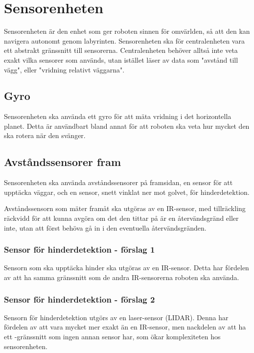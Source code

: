 \documentclass[a4paper,titlepage,12pt]{article}
\begin{document}
	\section{Sensorenheten}
    
    Sensorenheten är den enhet som ger roboten sinnen för omvärlden, så att den
    kan navigera autonomt genom labyrinten. Sensorenheten ska för
    centralenheten vara ett abstrakt gränssnitt till sensorerna. Centralenheten
    behöver alltså inte veta exakt vilka sensorer som används, utan istället
    läser av data som "avstånd till vägg", eller "vridning relativt väggarna".

    \subsection{Gyro}
    
    Sensorenheten ska använda ett gyro för att mäta vridning i det horizontella
    planet. Detta är användbart bland annat för att roboten ska veta hur mycket
    den ska rotera när den svänger.
    
    \subsection{Avståndssensorer fram}
    
    Sensorenheten ska använda avståndssensorer på framsidan, en sensor för att
    upptäcka väggar, och en sensor, snett vinklat ner mot golvet, för hinderdetektion. 

    Avståndssensorn som mäter framåt ska utgöras av en IR-sensor, med
    tillräckling räckvidd för att kunna avgöra om det den tittar på är en
    återvändsgränd eller inte, utan att först behöva gå in i den eventuella
    återvändsgränden.

    \subsubsection{Sensor för hinderdetektion - förslag 1}

    Sensorn som ska upptäcka hinder ska utgöras av en IR-sensor. Detta
    har fördelen av att ha samma gränssnitt som de andra IR-sensorerna roboten
    ska använda.

    \subsubsection{Sensor för hinderdetektion - förslag 2}

    Sensorn för hinderdetektion utgörs av en laser-sensor (LIDAR). Denna har
    fördelen av att vara mycket mer exakt än en IR-sensor, men nackdelen av att
    ha ett \itc-gränssnitt som ingen annan sensor har, som ökar
    komplexiteten hos sensorenheten.
\end{document}
